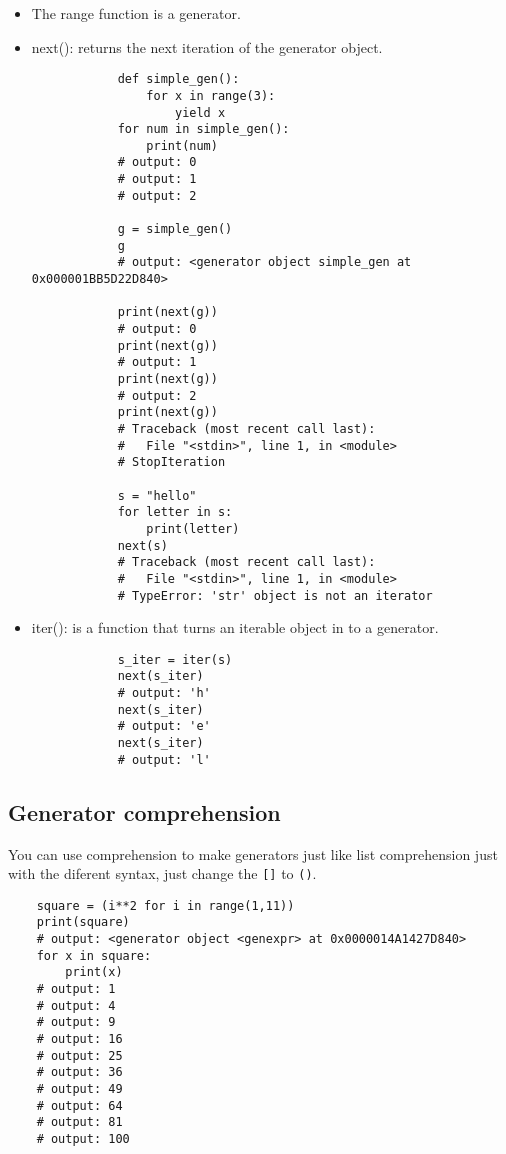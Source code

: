 \begin{itemize}
    \item The range function is a generator. 

    \item next(): returns the next iteration of the generator object.   
        \begin{verbatim}
            def simple_gen():
                for x in range(3):
                    yield x 
            for num in simple_gen():
                print(num)
            # output: 0
            # output: 1
            # output: 2

            g = simple_gen()
            g
            # output: <generator object simple_gen at 0x000001BB5D22D840>

            print(next(g))
            # output: 0
            print(next(g))
            # output: 1
            print(next(g))
            # output: 2
            print(next(g))
            # Traceback (most recent call last):
            #   File "<stdin>", line 1, in <module>
            # StopIteration

            s = "hello"
            for letter in s: 
                print(letter)
            next(s)
            # Traceback (most recent call last):
            #   File "<stdin>", line 1, in <module>
            # TypeError: 'str' object is not an iterator
        \end{verbatim}
    \item iter(): is a function that turns an iterable object in to a generator. 
        \begin{verbatim}
            s_iter = iter(s) 
            next(s_iter)
            # output: 'h'
            next(s_iter)
            # output: 'e'
            next(s_iter)
            # output: 'l'
        \end{verbatim}
\end{itemize}

\subsection{Generator comprehension}
You can use comprehension to make generators just like list comprehension just with the diferent syntax, just change the \verb|[]| to \verb|()|.
\begin{verbatim}
    square = (i**2 for i in range(1,11))
    print(square)
    # output: <generator object <genexpr> at 0x0000014A1427D840>
    for x in square:
        print(x)
    # output: 1
    # output: 4
    # output: 9
    # output: 16
    # output: 25
    # output: 36
    # output: 49
    # output: 64
    # output: 81
    # output: 100
\end{verbatim}
